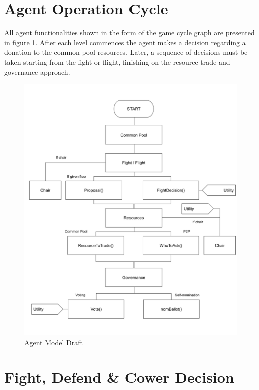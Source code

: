 \clearpage
\section{Agent Operation Cycle}

All agent functionalities shown in the form of the game cycle graph are presented in figure \ref{fig:agent_model}. After each level commences the agent makes a decision regarding a donation to the common pool resources. Later, a sequence of decisions must be taken starting from the fight or flight, finishing on the resource trade and governance approach.

\begin{figure}[htb]
    \centering
    \includegraphics[scale=0.35]{006_team_3_agent_design/FIGS/diagram.png}
    \caption{Agent Model Draft}
    \label{fig:agent_model}
\end{figure}

\clearpage


\section{Fight, Defend \& Cower Decision}

